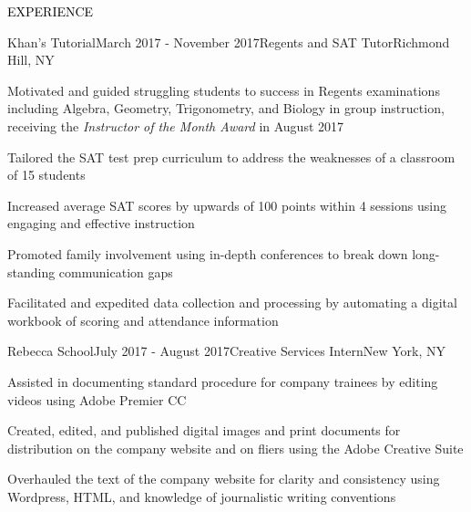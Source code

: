 \documentclass{resume} %
\renewenvironment{rSection}[1]{
\sectionskip
\textcolor{Black}{\MakeUppercase{#1}}
\sectionlineskip
\begin{list}{}{
\setlength{\leftmargin}{1.5em}
}
\item[]
}{
\end{list}
}
\begin{document}
\begin{rSection}{Experience}

  \begin{rSubsection}{Khan's Tutorial}{March 2017 - November 2017}{Regents and SAT Tutor}{Richmond Hill, NY}
    \item Motivated and guided struggling students to success in Regents examinations including Algebra, Geometry, Trigonometry, and Biology in group instruction, receiving the {\em Instructor of the Month Award} in August 2017
    \item Tailored the SAT test prep curriculum to address the weaknesses of a classroom of 15 students
    \item Increased average SAT scores by upwards of 100 points within 4 sessions using engaging and effective instruction %
    \item Promoted family involvement using in-depth conferences to break down long-standing communication gaps
    \item Facilitated and expedited data collection and processing by automating a digital workbook of scoring and attendance information
  \end{rSubsection}

  \begin{rSubsection}{Rebecca School}{July 2017 - August 2017}{Creative Services Intern}{New York, NY}
    \item Assisted in documenting standard procedure for company trainees by editing videos using Adobe Premier CC %
    \item Created, edited, and published digital images and print documents for distribution on the company website and on fliers using the Adobe Creative Suite
    \item Overhauled the text of the company website for clarity and consistency using Wordpress, HTML, and knowledge of journalistic writing conventions
  \end{rSubsection}


\end{rSection}
\end{document}
